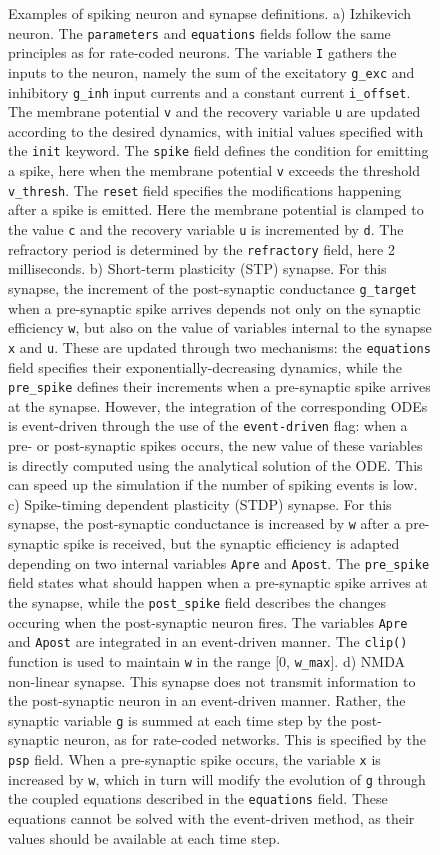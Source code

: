 \documentclass[
  11pt,
  a4paper,
]{scrbook}
\begin{document}
\begin{figure}
\caption{\label{fig-fini:spikecoded}Examples of spiking neuron and
synapse definitions. a) Izhikevich neuron. The \texttt{parameters} and
\texttt{equations} fields follow the same principles as for rate-coded
neurons. The variable \texttt{I} gathers the inputs to the neuron,
namely the sum of the excitatory \texttt{g\_exc} and inhibitory
\texttt{g\_inh} input currents and a constant current
\texttt{i\_offset}. The membrane potential \texttt{v} and the recovery
variable \texttt{u} are updated according to the desired dynamics, with
initial values specified with the \texttt{init} keyword. The
\texttt{spike} field defines the condition for emitting a spike, here
when the membrane potential \texttt{v} exceeds the threshold
\texttt{v\_thresh}. The \texttt{reset} field specifies the modifications
happening after a spike is emitted. Here the membrane potential is
clamped to the value \texttt{c} and the recovery variable \texttt{u} is
incremented by \texttt{d}. The refractory period is determined by the
\texttt{refractory} field, here 2 milliseconds. b) Short-term plasticity
(STP) synapse. For this synapse, the increment of the post-synaptic
conductance \texttt{g\_target} when a pre-synaptic spike arrives depends
not only on the synaptic efficiency \texttt{w}, but also on the value of
variables internal to the synapse \texttt{x} and \texttt{u}. These are
updated through two mechanisms: the \texttt{equations} field specifies
their exponentially-decreasing dynamics, while the \texttt{pre\_spike}
defines their increments when a pre-synaptic spike arrives at the
synapse. However, the integration of the corresponding ODEs is
event-driven through the use of the \texttt{event-driven} flag: when a
pre- or post-synaptic spikes occurs, the new value of these variables is
directly computed using the analytical solution of the ODE. This can
speed up the simulation if the number of spiking events is low. c)
Spike-timing dependent plasticity (STDP) synapse. For this synapse, the
post-synaptic conductance is increased by \texttt{w} after a
pre-synaptic spike is received, but the synaptic efficiency is adapted
depending on two internal variables \texttt{Apre} and \texttt{Apost}.
The \texttt{pre\_spike} field states what should happen when a
pre-synaptic spike arrives at the synapse, while the
\texttt{post\_spike} field describes the changes occuring when the
post-synaptic neuron fires. The variables \texttt{Apre} and
\texttt{Apost} are integrated in an event-driven manner. The
\texttt{clip()} function is used to maintain \texttt{w} in the range
{[}0, \texttt{w\_max}{]}. d) NMDA non-linear synapse. This synapse does
not transmit information to the post-synaptic neuron in an event-driven
manner. Rather, the synaptic variable \texttt{g} is summed at each time
step by the post-synaptic neuron, as for rate-coded networks. This is
specified by the \texttt{psp} field. When a pre-synaptic spike occurs,
the variable \texttt{x} is increased by \texttt{w}, which in turn will
modify the evolution of \texttt{g} through the coupled equations
described in the \texttt{equations} field. These equations cannot be
solved with the event-driven method, as their values should be available
at each time step.}

\end{figure}%
\end{document}
